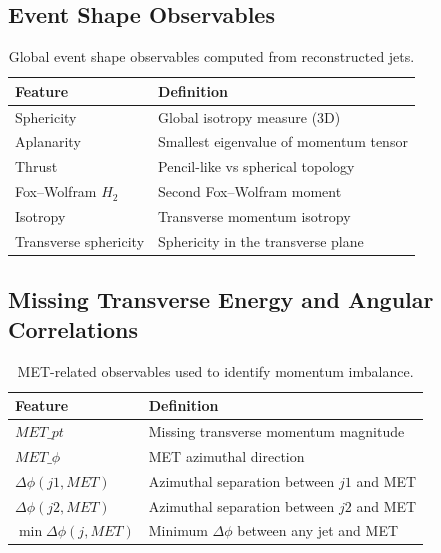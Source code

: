 \documentclass[11pt,a4paper,twocolumn]{article}
\begin{document}
\subsection{Event Shape Observables}

\begin{table}[H]
\centering
\caption{Global event shape observables computed from reconstructed jets.}
\footnotesize

\begin{tabular}{ll}
\toprule
Feature & Definition \\
\midrule
Sphericity & Global isotropy measure (3D) \\
Aplanarity & Smallest eigenvalue of momentum tensor \\
Thrust & Pencil-like vs spherical topology \\
Fox--Wolfram $H_2$ & Second Fox--Wolfram moment \\
Isotropy & Transverse momentum isotropy \\
Transverse sphericity & Sphericity in the transverse plane \\
\bottomrule
\end{tabular}

\end{table}

\subsection{Missing Transverse Energy and Angular Correlations}

\begin{table}[h]
\centering
\caption{MET-related observables used to identify momentum imbalance.}
\footnotesize

\begin{tabular}{ll}
\toprule
Feature & Definition \\
\midrule
$MET\_pt$ & Missing transverse momentum magnitude \\
$MET\_\phi$ & MET azimuthal direction \\
$\Delta\phi(j1, MET)$ & Azimuthal separation between $j1$ and MET \\
$\Delta\phi(j2, MET)$ & Azimuthal separation between $j2$ and MET \\
$\min\Delta\phi(j, MET)$ & Minimum $\Delta\phi$ between any jet and MET \\
\bottomrule
\end{tabular}

\end{table}
\end{document}
